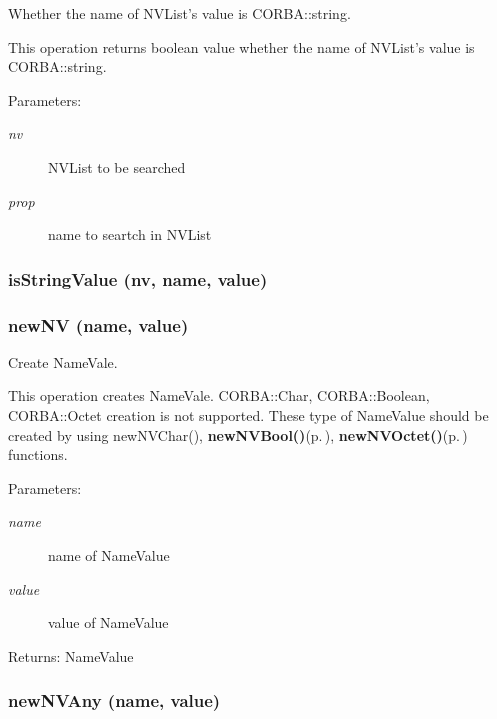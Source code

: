 Whether the name of NVList's value is CORBA::string. 

This operation returns boolean value whether the name of NVList's value is CORBA::string.

\begin{Desc}
\item[Parameters:]
\begin{description}
\item[{\em nv}]NVList to be searched \item[{\em prop}]name to seartch in NVList\end{description}
\end{Desc}
\subsubsection{\setlength{\rightskip}{0pt plus 5cm}is\-String\-Value (nv, name, value)}\label{NVUtil_8py_a10}


\subsubsection{\setlength{\rightskip}{0pt plus 5cm}new\-NV (name, value)}\label{NVUtil_8py_a0}


Create Name\-Vale. 

This operation creates Name\-Vale. CORBA::Char, CORBA::Boolean, CORBA::Octet creation is not supported. These type of Name\-Value should be created by using new\-NVChar(), {\bf new\-NVBool()}{\rm (p.\,\pageref{NVUtil_8py_a1})}, {\bf new\-NVOctet()}{\rm (p.\,\pageref{NVUtil_8py_a2})} functions. \begin{Desc}
\item[Parameters:]
\begin{description}
\item[{\em name}]name of Name\-Value \item[{\em value}]value of Name\-Value \end{description}
\end{Desc}
\begin{Desc}
\item[Returns:]Name\-Value\end{Desc}
\subsubsection{\setlength{\rightskip}{0pt plus 5cm}new\-NVAny (name, value)}\label{NVUtil_8py_a3}


